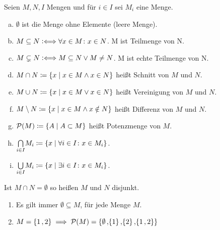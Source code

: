 \documentclass[../ana1.tex]{subfiles}
\begin{document}
\iftoggle{short}{}{\newpage}%

\begin{defi}[Mengenoperationen]
	Seien \(M,N,I\) Mengen und für \(i \in I\) sei \(M_{i}\) eine Menge.
	\begin{enumerate}[(a)]
		\item \(\emptyset\) ist die Menge ohne Elemente (leere Menge).
		\item \(M \subseteq N \mathrel{\vcentcolon\Longleftrightarrow} \forall x \in M \colon x \in N\). M ist Teilmenge von N.
		\item \(M \subsetneq N \mathrel{\vcentcolon\Longleftrightarrow} M \subseteq N \vee M \neq N\). M ist echte Teilmenge von N. 
		\item \(M \cap N \coloneqq \{x \; \vert \; x \in M \wedge x \in N\}\) heißt Schnitt von \(M\) und \(N\).
		\item \(M \cup N \coloneqq \{x \; \vert \; x \in M \vee x \in N\}\) heißt Vereinigung von \(M\) und \(N\).
		\item \(M \setminus N \coloneqq \{x \; \vert \; x \in M \wedge x \notin N\}\) heißt Differenz von \(M\) und \(N\).
		\item \(\mathcal{P}(M) \coloneqq \{A \; \vert \; A \subset M\}\) heißt Potenzmenge von \(M\).
		\item \(\underset{i \in I}{\bigcap} M_{i} \coloneqq \{x \; \vert \; \forall i\in I \colon x \in M_{i}\}\).
		\item \(\underset{i \in I}{\bigcup} M_{i} \coloneqq \{x \; \vert \; \exists i\in I \colon x \in M_{i}\}\).
	\end{enumerate}
	Ist \(M \cap N = \emptyset\) so heißen \(M\) und \(N\) disjunkt.
\end{defi}

\begin{bsp}\leavevmode
	\begin{enumerate}[(1)]
		\item Es gilt immer \(\emptyset \subseteq M\), für jede Menge \(M\).
		\item \(M = \{1\operatorname{,}2\} \implies \mathcal{P}(M) = \{\emptyset\operatorname{,}\{1\}\operatorname{,}\{2\}\operatorname{,}\{1\operatorname{,}2\}\}\)
	\end{enumerate}
\end{bsp}
\end{document}
